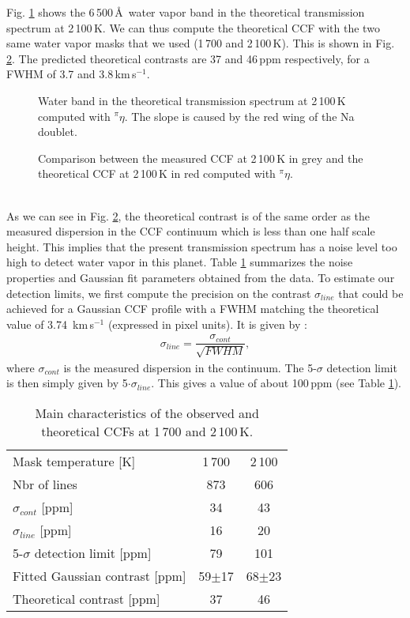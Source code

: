 \documentclass{aa}
\begin{document}
Fig. \ref{TS theory 2100} shows the 6\,500\,\AA\ water vapor band in the theoretical transmission spectrum at 2\,100\,K. We can thus compute the theoretical CCF with the two same water vapor masks that we used (1\,700 and 2\,100\,K). This is shown in Fig. \ref{comparaison data and model}. The predicted theoretical contrasts are 37 and 46\,ppm respectively, for a FWHM of 3.7 and 3.8\,km\,s$^{-1}$.\\
\begin{figure}[h]
\caption[comparaison model and data]{Water band in the theoretical transmission spectrum at 2\,100\,K computed with $^\pi \eta$. The slope is caused by the red wing of the Na doublet.}
\label{TS theory 2100}
\end{figure}
\begin{figure}[h]
\caption[comparaison model and data]{Comparison between the measured CCF at 2\,100\,K in grey and the theoretical CCF at 2\,100\,K in red computed with $^\pi \eta$.}
\label{comparaison data and model}
\end{figure}
\\
As we can see in Fig. \ref{comparaison data and model}, the theoretical contrast is of the same order as the measured dispersion in the CCF continuum which is less than one half scale height. This implies that the present transmission spectrum has a noise level too high to detect water vapor in this planet. Table \ref{recap résultat} summarizes the noise properties and Gaussian fit parameters obtained from the data. To estimate our detection limits, we first compute the precision on the contrast $\sigma_{line}$ that could be achieved for a Gaussian CCF profile with a FWHM matching the theoretical value of 3.74\, km\,s$^{-1}$ (expressed in pixel units). It is given by :
\begin{eqnarray}
\sigma_{line}=\dfrac{\sigma_{cont}}{\sqrt{FWHM}},
\label{line noise}
\end{eqnarray}
where $\sigma_{cont}$ is the measured dispersion in the continuum. The 5-$\sigma$ detection limit is then simply given by 5$\cdot \sigma_{line}$. This gives a value of about 100\,ppm (see Table \ref{recap résultat}).\\
\begin{table}[h]
\centering
\begin{tabular}{lcc}
\hline
Mask temperature  [K] & 1\,700 & 2\,100 \\ 
Nbr of lines & 873 & 606 \\
\hline
$\sigma_{cont}$ [ppm] & 34 & 43  \\
$\sigma_{line}$ [ppm] & 16 & 20 \\
5-$\sigma$ detection limit [ppm] & 79 & 101\\
\hline
Fitted Gaussian contrast [ppm] & 59$\pm$17 & 68$\pm$23 \\
Theoretical contrast [ppm]& 37 & 46 \\
\hline
\end{tabular}
\caption{Main characteristics of the observed and theoretical CCFs at 1\,700 and 2\,100\,K.}
\label{recap résultat}
\end{table}
\end{document}
